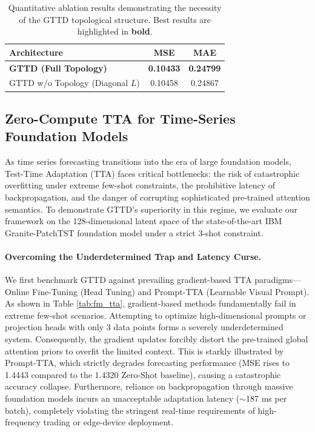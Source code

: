 \documentclass{article}
\begin{document}
\begin{table}[ht]
\centering
\caption{Quantitative ablation results demonstrating the necessity of the GTTD topological structure. Best results are highlighted in \textbf{bold}.}
\label{tab:ablation_topology}
\renewcommand{\arraystretch}{1.2}
\begin{tabular}{l | cc}
\toprule
\textbf{Architecture} & \textbf{MSE} & \textbf{MAE} \\
\midrule
\textbf{GTTD (Full Topology)} & \textbf{0.10433} & \textbf{0.24799} \\
GTTD w/o Topology (Diagonal $L$) & 0.10458 & 0.24867 \\
\bottomrule
\end{tabular}
\end{table}

\subsection{Zero-Compute TTA for Time-Series Foundation Models}

As time series forecasting transitions into the era of large foundation models, Test-Time Adaptation (TTA) faces critical bottlenecks: the risk of catastrophic overfitting under extreme few-shot constraints, the prohibitive latency of backpropagation, and the danger of corrupting sophisticated pre-trained attention semantics. To demonstrate GTTD's superiority in this regime, we evaluate our framework on the 128-dimensional latent space of the state-of-the-art IBM Granite-PatchTST foundation model under a strict 3-shot constraint.

\paragraph{Overcoming the Underdetermined Trap and Latency Curse.} We first benchmark GTTD against prevailing gradient-based TTA paradigms---Online Fine-Tuning (Head Tuning) and Prompt-TTA (Learnable Visual Prompt). As shown in Table \ref{tab:fm_tta}, gradient-based methods fundamentally fail in extreme few-shot scenarios. Attempting to optimize high-dimensional prompts or projection heads with only 3 data points forms a severely underdetermined system. Consequently, the gradient updates forcibly distort the pre-trained global attention priors to overfit the limited context. This is starkly illustrated by Prompt-TTA, which strictly degrades forecasting performance (MSE rises to 1.4443 compared to the 1.4320 Zero-Shot baseline), causing a catastrophic accuracy collapse. Furthermore, reliance on backpropagation through massive foundation models incurs an unacceptable adaptation latency ($\sim$187 ms per batch), completely violating the stringent real-time requirements of high-frequency trading or edge-device deployment.
\end{document}
